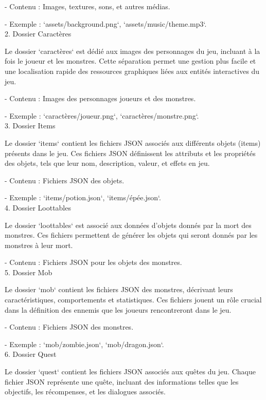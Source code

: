    - Contenu : Images, textures, sons, et autres médias.

   - Exemple : `assets/background.png`, `assets/music/theme.mp3`.
\\

2. Dossier Caractères

   Le dossier `caractères` est dédié aux images des personnages du jeu, incluant à la fois le joueur et les monstres.
    Cette séparation permet une gestion plus facile et une localisation rapide des ressources graphiques liées aux entités interactives du jeu.
   
   - Contenu : Images des personnages joueurs et des monstres.
  
   - Exemple : `caractères/joueur.png`, `caractères/monstre.png`.
\\

3. Dossier Items

   Le dossier `items` contient les fichiers JSON associés aux différents objets (items) présents dans le jeu. 
   Ces fichiers JSON définissent les attributs et les propriétés des objets, tels que leur nom, description, valeur, et effets en jeu.

   - Contenu : Fichiers JSON des objets.

   - Exemple : `items/potion.json`, `items/épée.json`.
\\

4. Dossier Loottables

   Le dossier `loottables` est associé aux données d'objets donnés par la mort des monstres. 
   Ces fichiers permettent de générer les objets qui seront donnés par les monstres à leur mort.

   - Contenu : Fichiers JSON pour les objets des monstres.
\\

5. Dossier Mob

   Le dossier `mob` contient les fichiers JSON des monstres, décrivant leurs caractéristiques, comportements et statistiques. Ces fichiers jouent un rôle crucial dans la définition des ennemis que les joueurs rencontreront dans le jeu.

   - Contenu : Fichiers JSON des monstres.

   - Exemple : `mob/zombie.json`, `mob/dragon.json`.
   \\

6. Dossier Quest

   Le dossier `quest` contient les fichiers JSON associés aux quêtes du jeu. Chaque fichier JSON représente une quête, incluant des informations telles que les objectifs, les récompenses, et les dialogues associés.

